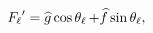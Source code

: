 $\mathop{F_{\ell}\/}\nolimits'=\widehat{g}\mathop{\cos\/}\nolimits\mathop{{%
\theta_{\ell}}\/}\nolimits+\widehat{f}\mathop{\sin\/}\nolimits\mathop{{\theta_%
{\ell}}\/}\nolimits,$